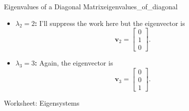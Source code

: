 \begin{ex}{Eigenvalues of a Diagonal Matrix}{eigenvalues_of_diagonal}
\begin{enumerate}
\begin{itemize}
\begin{align*}
                0x+0y+2z&=0 ~\implies~ z=0.
            \end{align*}
            So we have a solution
            \[
            \mathbf{v}_1 =\begin{bmatrix}
            t\\ 0\\ 0\\
            \end{bmatrix}.
            \]
            We usually take $t=1$ and say that the eigenvector is 
            \[
            \mathbf{v}_1 =\begin{bmatrix}
            1\\ 0 \\ 0
            \end{bmatrix}.
            \]
            \item \textbf{$\lambda_2=2$:} I'll suppress the work here but the eigenvector is
            \[
            \mathbf{v}_2 = \begin{bmatrix}
            0 \\ 1 \\ 0
            \end{bmatrix}.
            \]
            \item \textbf{$\lambda_3=3$:} Again, the eigenvector is
            \[
            \mathbf{v}_3=\begin{bmatrix}
            0 \\ 0 \\ 1
            \end{bmatrix}.
            \]
        \end{itemize}
        \end{enumerate}
        \end{ex}

\begin{center}
\Large{Worksheet: Eigensystems}
\end{center}


\normalsize

